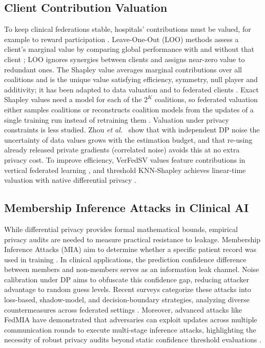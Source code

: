\documentclass[journal]{IEEEtran}
\begin{document}
\subsection{Client Contribution Valuation}
To keep clinical federations stable, hospitals' contributions must be valued, for example to reward participation \cite{Kazlouski2025HospitalParticipation, Lyu2020FairnessFL}. Leave-One-Out (LOO) methods assess a client's marginal value by comparing global performance with and without that client \cite{Ghorbani2019DataShapley}; LOO ignores synergies between clients and assigns near-zero value to redundant ones. The Shapley value \cite{Shapley1953} averages marginal contributions over all coalitions and is the unique value satisfying efficiency, symmetry, null player and additivity; it has been adapted to data valuation \cite{Ghorbani2019DataShapley, Jia2019KNNShapley, Ghorbani2020NeuronShapley} and to federated clients \cite{Song2019BlockchainFL, Wei2020DataValuation}. Exact Shapley values need a model for each of the $2^K$ coalitions, so federated valuation either samples coalitions \cite{Maleki2013Bounding, Jia2020EfficientShapley} or reconstructs coalition models from the updates of a single training run instead of retraining them \cite{Song2019BlockchainFL, Wei2020DataValuation, Liu2022GTG}. Valuation under privacy constraints is less studied. Zhou \emph{et al.}\ \cite{Zhou2025Data} show that with independent DP noise the uncertainty of data values grows with the estimation budget, and that re-using already released private gradients (correlated noise) avoids this at no extra privacy cost. To improve efficiency, VerFedSV values feature contributions in vertical federated learning \cite{Fan2024VerFedSV}, and threshold KNN-Shapley achieves linear-time valuation with native differential privacy \cite{wang2023threshold}.

\subsection{Membership Inference Attacks in Clinical AI}
While differential privacy provides formal mathematical bounds, empirical privacy audits are needed to measure practical resistance to leakage. Membership Inference Attacks (MIA) aim to determine whether a specific patient record was used in training \cite{Shokri2017MIA}. In clinical applications, the prediction confidence difference between members and non-members serves as an information leak channel. Noise calibration under DP aims to obfuscate this confidence gap, reducing attacker advantage to random guess levels. Recent surveys categorize these attacks into loss-based, shadow-model, and decision-boundary strategies, analyzing diverse countermeasures across federated settings \cite{Bai2025MIA}. Moreover, advanced attacks like FedMIA have demonstrated that adversaries can exploit updates across multiple communication rounds to execute multi-stage inference attacks, highlighting the necessity of robust privacy audits beyond static confidence threshold evaluations \cite{Zhu2025FedMIA}.
\end{document}
